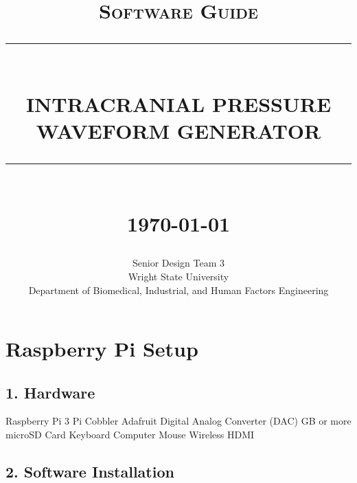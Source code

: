 \documentclass[12pt]{report}
\newcommand{\HRule}[1]{\rule{\linewidth}{#1}}
\begin{document}
\title{ \normalsize \textsc{Software Guide}
		\\ [2.0cm]
		\HRule{0.5pt} \\
		\LARGE \textbf{\uppercase{Intracranial Pressure Waveform Generator}}
		\HRule{2pt} \\ [0.5cm]
		\normalsize \today \vspace*{5\baselineskip}}

\date{}

\author{
		Senior Design Team 3 \\
		Wright State University \\
		Department of Biomedical, Industrial, and Human Factors Engineering }

\maketitle
\tableofcontents
\newpage

\sectionfont{\scshape}



\listoffigures
\newpage

\lstlistoflistings
\newpage


\section*{Raspberry Pi Setup}
\subsection*{1. Hardware}
Raspberry Pi 3 \newline Pi Cobbler \newline Adafruit Digital Analog Converter (DAC)  GB or more microSD Card \newline Keyboard \newline Computer Mouse \newline Wireless HDMI
\subsection*{2. Software Installation}
\end{document}
